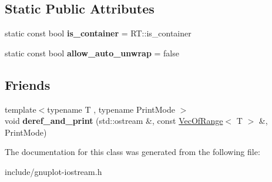 \subsection*{Static Public Attributes}
\begin{DoxyCompactItemize}
\item 
\mbox{\label{classgnuplotio_1_1VecOfRange_a8725d4907d46575dddb7152f1f1d1f66}} 
static const bool {\bfseries is\+\_\+container} = R\+T\+::is\+\_\+container
\item 
\mbox{\label{classgnuplotio_1_1VecOfRange_a19d87e61a7854f9e22d3dd8a94f79500}} 
static const bool {\bfseries allow\+\_\+auto\+\_\+unwrap} = false
\end{DoxyCompactItemize}
\subsection*{Friends}
\begin{DoxyCompactItemize}
\item 
\mbox{\label{classgnuplotio_1_1VecOfRange_adafbfb0122b8e499d1af9c246f4ac288}} 
{\footnotesize template$<$typename T , typename Print\+Mode $>$ }\\void {\bfseries deref\+\_\+and\+\_\+print} (std\+::ostream \&, const \hyperlink{classgnuplotio_1_1VecOfRange}{Vec\+Of\+Range}$<$ T $>$ \&, Print\+Mode)
\end{DoxyCompactItemize}


The documentation for this class was generated from the following file\+:\begin{DoxyCompactItemize}
\item 
include/gnuplot-\/iostream.\+h\end{DoxyCompactItemize}
